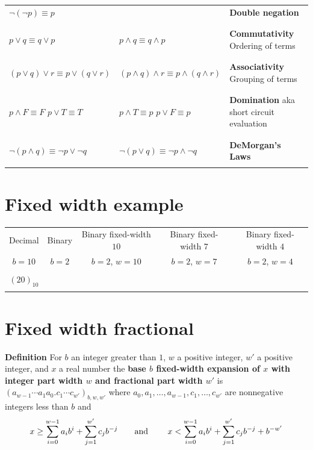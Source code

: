 \documentclass[12pt, oneside]{article}
\begin{document}
\begin{tabular}{llp{3in}}
$\lnot ( \lnot p) \equiv p$ & & {\bf Double negation}\\
&& \\
&& \\
$p \lor q \equiv q \lor p$ & $p \land q \equiv q \land p$ & {\bf Commutativity} Ordering of terms\\
&& \\
&& \\
$(p \lor q) \lor r  \equiv p \lor (q \lor r)$ & $(p \land q) \land r  \equiv p \land (q \land r)$ & {\bf Associativity} Grouping of terms\\
&& \\
&& \\
$p \land F \equiv F$ \qquad $p \lor T \equiv T$ & $p \land T \equiv p$ \qquad $p \lor F \equiv p$ & {\bf Domination} aka 
short circuit evaluation\\
&& \\
&& \\
$\lnot (p \land q) \equiv \lnot p \lor \lnot q$ & $\lnot (p \lor q) \equiv \lnot p \land\lnot q$  & {\bf DeMorgan's Laws}\\
&& \\
\end{tabular}
 \vfill
\section*{Fixed width example}


\begin{center}
    \begin{tabular}{|c|c|c|c|c|}
    \hline
    Decimal &  Binary  & Binary fixed-width $10$& Binary fixed-width $7$ & Binary fixed-width $4$\\
    $b=10$ & $b=2$ & $b=2$, $w =  10$& $b=2$, $w =  7$& $b=2$, $w =  4$ \\
    \hline 
    &&&&  \\
    $(20)_{10}$&\phantom{$(10100)_{2}$\qquad\qquad}&&  &\\
    &&&&  \\
\hline
    \end{tabular}
    \end{center}
 \vfill
\section*{Fixed width fractional}




{\bf Definition} For $b$ an integer greater than $1$, $w$ a positive integer, 
$w'$ a positive  integer, and $x$ a real number the {\bf base $b$ fixed-width 
expansion of $x$ with integer part width $w$  and fractional part width $w'$} is
$(a_{w-1} \cdots a_1 a_0 .  c_{1} \cdots c_{w'})_{b,w,w'}$
where  $a_0, a_1, \ldots, a_{w-1}, c_1, \ldots, c_{w'}$ are nonnegative integers less than $b$ and
$$x \geq \sum_{i=0}^{w-1} a_{i} b^{i} + \sum_{j=1}^{w'}  c_{j} b^{-j} \hfill
\textrm{\qquad and \qquad}
\hfill x < \sum_{i=0}^{w-1} a_{i} b^{i} + \sum_{j=1}^{w'} c_{j} b^{-j} + b^{-w'}$$
 
\end{document}

